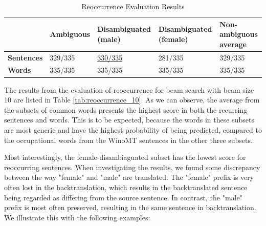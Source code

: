 \begin{table}[!htb]
    \begin{subtable}{\textwidth}
        \centering
        \begin{tabularx}{\linewidth}{|X|XXXX|}
            \hline
             & \textbf{Ambiguous} & \textbf{Disambiguated (male)} & \textbf{Disambiguated (female)} & \textbf{Non-ambiguous average} \\ \hline
             \textbf{Sentences} & 329/335 & \underline{330/335} & 281/335 & 329/335 \\ 
             \textbf{Words} & 335/335 & 335/335 & 335/335 & 335/335 \\ \hline
        \end{tabularx}
        \label{tab:reoccurrence_100}
    \end{subtable}
    
    \caption{Reoccurrence Evaluation Results}
    \label{tab:reoccurrence}
\end{table}

The results from the evaluation of reoccurrence for beam search with beam size 10 are listed in Table \ref{tab:reoccurrence_10}.
As we can observe, the average from the subsets of common words presents the highest score in both the recurring sentences and words. This is to be expected, because the words in these subsets are most generic and have the highest probability of being predicted, compared to the occupational words from the WinoMT sentences in the other three subsets. 

Most interestingly, the female-disambiaguated subset has the lowest score for reoccurring sentences. When investigating the results, we found some discrepancy between the way "female" and "male" are translated. The "female" prefix is very often lost in the backtranslation, which results in the backtranslated sentence being regarded as differing from the source sentence. In contrast, the "male" prefix is most often preserved, resulting in the same sentence in backtranslation. We illustrate this with the following examples:

